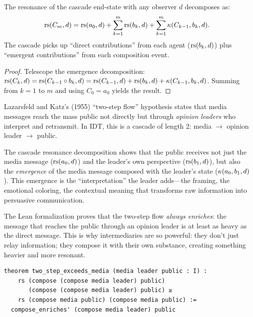 \begin{theorem}
\label{thm:cascade-resonance-decomp}
The resonance of the cascade end-state with any observer $d$ decomposes as:
\[
  \mathrm{rs}(C_m, d) = \mathrm{rs}(a_0, d) + \sum_{k=1}^{m} \mathrm{rs}(b_k, d)
  + \sum_{k=1}^{m} \kappa(C_{k-1}, b_k, d).
\]
The cascade picks up ``direct contributions'' from each agent ($\mathrm{rs}(b_k, d)$)
plus ``emergent contributions'' from each composition event.
\end{theorem}

\begin{proof}
Telescope the emergence decomposition: $\mathrm{rs}(C_k, d) = \mathrm{rs}(C_{k-1} \circ b_k, d)
= \mathrm{rs}(C_{k-1}, d) + \mathrm{rs}(b_k, d) + \kappa(C_{k-1}, b_k, d)$.  Summing from
$k = 1$ to $m$ and using $C_0 = a_0$ yields the result.
\end{proof}

\begin{interpretation}
\label{interp:two-step-flow}
Lazarsfeld and Katz's (1955) ``two-step flow'' hypothesis states that media
messages reach the mass public not directly but through \emph{opinion leaders}
who interpret and retransmit.  In IDT, this is a cascade of length 2:
media $\to$ opinion leader $\to$ public.

The cascade resonance decomposition shows that the public receives not
just the media message ($\mathrm{rs}(a_0, d)$) and the leader's own perspective
($\mathrm{rs}(b_1, d)$), but also the \emph{emergence} of the media message
composed with the leader's state ($\kappa(a_0, b_1, d)$).  This emergence
is the ``interpretation'' the leader adds---the framing, the emotional
coloring, the contextual meaning that transforms raw information into
persuasive communication.

The Lean formalization proves that the two-step flow \emph{always enriches}:
the message that reaches the public through an opinion leader is at least
as heavy as the direct message.  This is why intermediaries are so powerful:
they don't just relay information; they compose it with their own substance,
creating something heavier and more resonant.

\begin{lstlisting}[caption={Lean 4: Two-step flow enrichment}]
theorem two_step_exceeds_media (media leader public : I) :
    rs (compose (compose media leader) public)
       (compose (compose media leader) public) ≥
    rs (compose media public) (compose media public) :=
  compose_enriches' (compose media leader) public
\end{lstlisting}
\end{interpretation}

